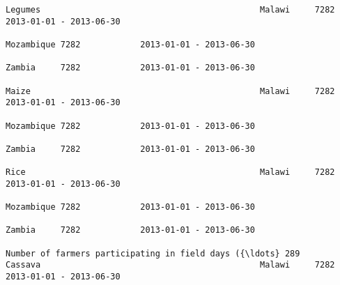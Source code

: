 \documentclass[11pt]{article}
\begin{document}
\begin{Verbatim}[commandchars=\\\{\}]
                                                                                                                                                              Legumes                                            Malawi     7282            2013-01-01 - 2013-06-30   
                                                                                                                                                                                                                 Mozambique 7282            2013-01-01 - 2013-06-30   
                                                                                                                                                                                                                 Zambia     7282            2013-01-01 - 2013-06-30   
                                                                                                                                                              Maize                                              Malawi     7282            2013-01-01 - 2013-06-30   
                                                                                                                                                                                                                 Mozambique 7282            2013-01-01 - 2013-06-30   
                                                                                                                                                                                                                 Zambia     7282            2013-01-01 - 2013-06-30   
                                                                                                                                                              Rice                                               Malawi     7282            2013-01-01 - 2013-06-30   
                                                                                                                                                                                                                 Mozambique 7282            2013-01-01 - 2013-06-30   
                                                                                                                                                                                                                 Zambia     7282            2013-01-01 - 2013-06-30   
                                                                         Number of farmers participating in field days ({\ldots} 289                               Cassava                                            Malawi     7282            2013-01-01 - 2013-06-30   

\end{Verbatim}
\end{document}
